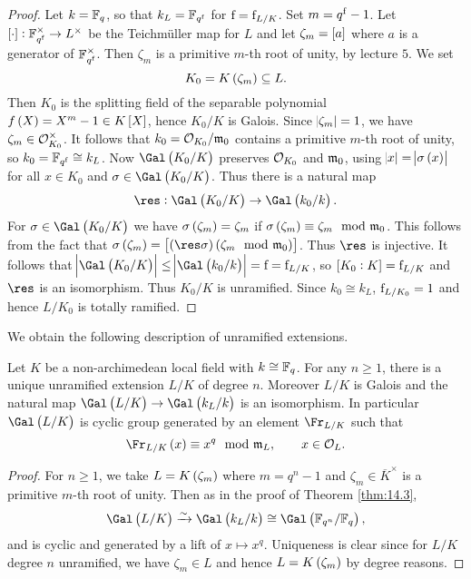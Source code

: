 \begin{proof}
Let $ k = \mathbb{F}_q $, so that $ k_L = \mathbb{F}_{q^{\mathrm{f}}} $ for $ \mathrm{f} = \mathrm{f}_{L / K} $. Set $ m = q^{\mathrm{f}} - 1 $. Let $ \sbr{\cdot} : \FF_{q^\f}^\times \to L^\times $ be the Teichm\"uller map for $ L $ and let $ \zeta_m = \sbr{a} $ where $ a $ is a generator of $ \mathbb{F}_{q^{\mathrm{f}}}^\times $. Then $ \zeta_m $ is a primitive $ m $-th root of unity, by lecture $ 5 $. We set
$$ K_0 = K\br{\zeta_m} \subseteq L. $$
Then $ K_0 $ is the splitting field of the separable polynomial $ f\br{X} = X^m - 1 \in K\sbr{X} $, hence $ K_0 / K $ is Galois. Since $ \abs{\zeta_m} = 1 $, we have $ \zeta_m \in \mathcal{O}_{K_0}^\times $. It follows that $ k_0 = \mathcal{O}_{K_0} / \mathfrak{m}_0 $ contains a primitive $ m $-th root of unity, so $ k_0 = \mathbb{F}_{q^{\mathrm{f}}} \cong k_L $. Now $ \Gal\br{K_0 / K} $ preserves $ \mathcal{O}_{K_0} $ and $ \mathfrak{m}_0 $, using $ \abs{x} = \abs{\sigma\br{x}} $ for all $ x \in K_0 $ and $ \sigma \in \Gal\br{K_0 / K} $. Thus there is a natural map
$$ \res : \Gal\br{K_0 / K} \to \Gal\br{k_0 / k}. $$
For $ \sigma \in \Gal\br{K_0 / K} $ we have $ \sigma\br{\zeta_m} = \zeta_m $ if $ \sigma\br{\zeta_m} \equiv \zeta_m \mod \mmm_0 $. This follows from the fact that $ \sigma\br{\zeta_m} = \sbr{\br{\res \sigma}\br{\zeta_m \mod \mmm_0}} $. Thus $ \res $ is injective. It follows that $ \abs{\Gal\br{K_0 / K}} \le \abs{\Gal\br{k_0 / k}} = \f = \f_{L / K} $, so $ \sbr{K_0 : K} = \f_{L / K} $ and $ \res $ is an isomorphism. Thus $ K_0 / K $ is unramified. Since $ k_0 \cong k_L $, $ \mathrm{f}_{L / K_0} = 1 $ and hence $ L / K_0 $ is totally ramified.
\end{proof}

We obtain the following description of unramified extensions.

\begin{theorem}
\label{thm:14.4}
Let $ K $ be a non-archimedean local field with $ k \cong \mathbb{F}_q $. For any $ n \ge 1 $, there is a unique unramified extension $ L / K $ of degree $ n $. Moreover $ L / K $ is Galois and the natural map $ \Gal\br{L / K} \to \Gal\br{k_L / k} $ is an isomorphism. In particular $ \Gal\br{L / K} $ is cyclic group generated by an element $ \Fr_{L / K} $ such that
$$ \Fr_{L / K}\br{x} \equiv x^q \mod \mmm_L, \qquad x \in \OOO_L. $$
\end{theorem}

\pagebreak

\begin{proof}
For $ n \ge 1 $, we take $ L = K\br{\zeta_m} $ where $ m = q^n - 1 $ and $ \zeta_m \in \overline{K}^\times $ is a primitive $ m $-th root of unity. Then as in the proof of Theorem \ref{thm:14.3},
$$ \Gal\br{L / K} \xrightarrow{\sim} \Gal\br{k_L / k} \cong \Gal\br{\FF_{q^n} / \FF_q}, $$
and is cyclic and generated by a lift of $ x \mapsto x^q $. Uniqueness is clear since for $ L / K $ degree $ n $ unramified, we have $ \zeta_m \in L $ and hence $ L = K\br{\zeta_m} $ by degree reasons.
\end{proof}

